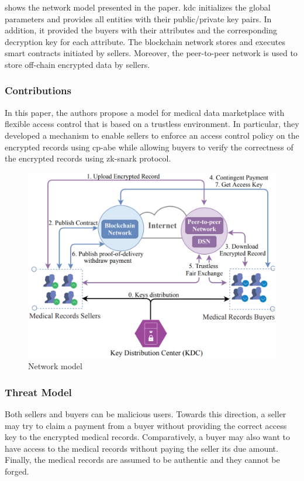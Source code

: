  shows the network model presented in the paper.
\ac{kdc} initializes the global parameters and provides all entities with their public/private key pairs.
In addition, it provided the buyers with their attributes and the corresponding decryption key for each attribute.
The blockchain network stores and executes smart contracts initiated by sellers.
Moreover, the peer-to-peer network is used to store off-chain encrypted data by sellers.


\subsubsection{Contributions}
In this paper, the authors propose a model for medical data marketplace with flexible access control that is based on a trustless environment.
In particular, they developed a mechanism to enable sellers to enforce an access control policy on the encrypted records using \ac{cp-abe} while allowing buyers to verify the correctness of the encrypted records using \ac{zk-snark} protocol.

\begin{figure}
\centering
  \includegraphics[width=1\linewidth]{imgs/20-network-model.eps}
  \caption{Network model~\cite{alsharif2020blockchain}}
  \label{fig:20-network-model}
\end{figure}

\subsubsection{Threat Model}
Both sellers and buyers can be malicious users.
Towards this direction, a seller may try to claim a payment from a buyer without providing the correct access key to the encrypted medical records.
Comparatively, a buyer may also want to have access to the medical records without paying the seller its due amount.
Finally, the medical records are assumed to be authentic and they cannot be forged.

